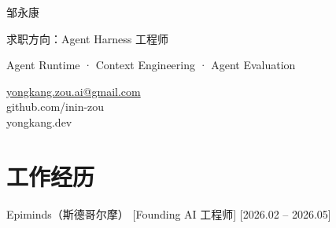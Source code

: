 \documentclass{resume}
\newcommand{\BodyFont}{%
  \zihao{5}
  \setlength{\baselineskip}{15pt}
}
\newcommand{\DetailFont}{%
  \zihao{-5}
}
\begin{document}
\BodyFont


\begin{minipage}[t]{0.60\textwidth}
  \vspace{0pt}

  {\heiti 邹永康\par}

  \vspace{5pt}

  {\heiti
    求职方向：Agent Harness 工程师\par
  }

  \vspace{4pt}

  {\DetailFont
    Agent Runtime · Context Engineering · Agent Evaluation\par
  }
\end{minipage}\hfill
\begin{minipage}[t]{0.38\textwidth}
  \vspace{0pt}
  \raggedleft

  \href{mailto:yongkang.zou.ai@gmail.com}
       {yongkang.zou.ai@gmail.com}\\
            {github.com/inin-zou}\\
            {yongkang.dev}
\end{minipage}

\par\vspace{4pt}


\section{工作经历}

\ResumeItem
  {Epiminds（斯德哥尔摩）}
  [Founding AI 工程师]
  [2026.02 -- 2026.05]
\end{document}
